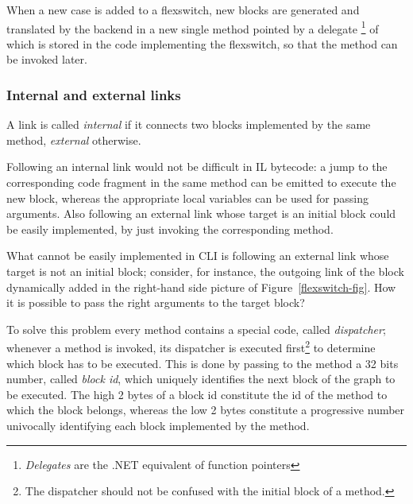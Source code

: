 When  a new case is added to a flexswitch, new blocks are generated
and translated by the backend in a new single method pointed
by a delegate \footnote{\emph{Delegates} are the .NET equivalent of function pointers}
 of  which is stored in the code implementing the flexswitch,
so that the method can be invoked later.

\subsubsection{Internal and external links}

A link is called \emph{internal} if it connects two blocks implemented
by the same method,
 \emph{external} otherwise.

Following an internal link would  not be difficult in IL bytecode: a jump to
the corresponding code fragment in the same method can be emitted 
to execute the new block, whereas the appropriate local variables can be
used for passing arguments. 
Also following an external link whose target is an initial block could
be easily implemented, by just invoking the corresponding method.

What cannot be easily implemented in CLI is following an external link
whose target is not an initial block; consider, for instance, the
outgoing link of the block dynamically added in the right-hand side
picture of Figure~\ref{flexswitch-fig}. How it is possible to pass the
right arguments to the target block?

To solve this problem every method contains a special code, called
\emph{dispatcher}; whenever a method is invoked, its dispatcher is
executed first\footnote{The dispatcher should not be
confused with the initial block of a method.} to
determine which block has to be executed.
This is done by passing to the method a 32 bits number, called 
\emph{block id}, which uniquely identifies the next block of the graph to be executed.
The high 2 bytes  of a block id constitute the id of the method to which the block
belongs, whereas the low 2 bytes constitute a progressive number univocally identifying
each block implemented by the method.

